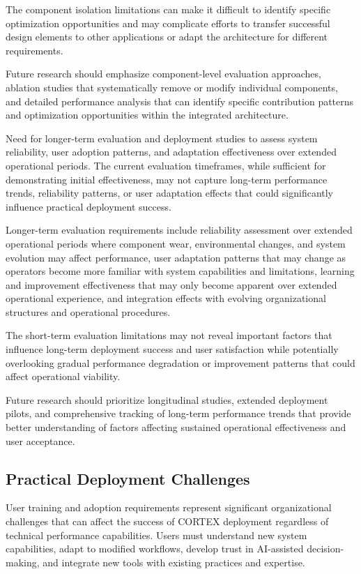 The component isolation limitations can make it difficult to identify specific optimization opportunities and may complicate efforts to transfer successful design elements to other applications or adapt the architecture for different requirements.

Future research should emphasize component-level evaluation approaches, ablation studies that systematically remove or modify individual components, and detailed performance analysis that can identify specific contribution patterns and optimization opportunities within the integrated architecture.

Need for longer-term evaluation and deployment studies to assess system reliability, user adoption patterns, and adaptation effectiveness over extended operational periods. The current evaluation timeframes, while sufficient for demonstrating initial effectiveness, may not capture long-term performance trends, reliability patterns, or user adaptation effects that could significantly influence practical deployment success.

Longer-term evaluation requirements include reliability assessment over extended operational periods where component wear, environmental changes, and system evolution may affect performance, user adaptation patterns that may change as operators become more familiar with system capabilities and limitations, learning and improvement effectiveness that may only become apparent over extended operational experience, and integration effects with evolving organizational structures and operational procedures.

The short-term evaluation limitations may not reveal important factors that influence long-term deployment success and user satisfaction while potentially overlooking gradual performance degradation or improvement patterns that could affect operational viability.

Future research should prioritize longitudinal studies, extended deployment pilots, and comprehensive tracking of long-term performance trends that provide better understanding of factors affecting sustained operational effectiveness and user acceptance.

\subsection{Practical Deployment Challenges}

User training and adoption requirements represent significant organizational challenges that can affect the success of CORTEX deployment regardless of technical performance capabilities. Users must understand new system capabilities, adapt to modified workflows, develop trust in AI-assisted decision-making, and integrate new tools with existing practices and expertise.

